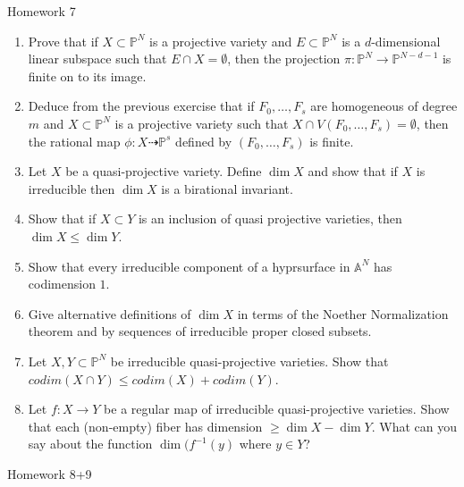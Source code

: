 \documentclass[12pt]{amsart}
\begin{document}
\centerline{Homework 7}
\begin{enumerate}
\item Prove that if $X\subset \mathbb P ^N$ is a projective variety and $E\subset \mathbb P ^N$ is a $d$-dimensional linear subspace such that $E\cap X=\emptyset$, then the projection $\pi : \mathbb P ^N\to \mathbb P ^{N-d-1}$ is finite on to its image.
\item Deduce from the previous exercise that if $F_0, \ldots , F_s$ are homogeneous of degree $m$ and $X\subset \mathbb P ^N$ is a projective variety such that $X\cap V(F_0, \ldots , F_s)=\emptyset $, then the rational map $\phi :X\dasharrow \mathbb P ^s$ defined by $ (F_0, \ldots , F_s)$ is finite.
\item Let $X$ be a quasi-projective variety. Define $\dim X$ and show that if $X$ is irreducible then $\dim X$ is a birational invariant.
\item Show that if $X\subset Y$ is an inclusion of quasi projective varieties, then $\dim X\leq \dim Y$.
\item Show that every irreducible component of a hyprsurface in $\mathbb A ^N$ has codimension $1$.
\item Give alternative definitions of $\dim X$ in terms of the Noether Normalization theorem and by sequences of irreducible proper closed subsets.
\item Let $X,Y\subset \mathbb P ^N$ be irreducible quasi-projective varieties. Show that $codim (X\cap Y)\leq codim (X)+codim (Y)$.
\item Let $f:X\to Y$ be a regular map of  irreducible quasi-projective varieties. Show that each (non-empty) fiber has dimension $\geq \dim X-\dim Y$. What can you say about the function $\dim (f^{-1}(y)$ where $y\in Y$? 
\end{enumerate}
\centerline{Homework 8+9}
\end{document}
